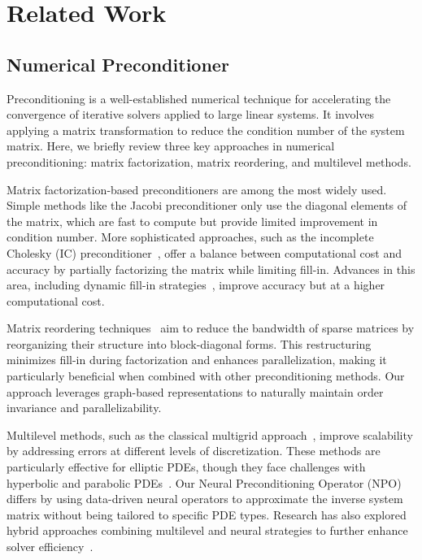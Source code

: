 \section{Related Work}
\label{appendix:relate}
\subsection{Numerical Preconditioner}

Preconditioning is a well-established numerical technique for accelerating the convergence of iterative solvers applied to large linear systems. It involves applying a matrix transformation to reduce the condition number of the system matrix. Here, we briefly review three key approaches in numerical preconditioning: matrix factorization, matrix reordering, and multilevel methods.

Matrix factorization-based preconditioners are among the most widely used. Simple methods like the Jacobi preconditioner only use the diagonal elements of the matrix, which are fast to compute but provide limited improvement in condition number. More sophisticated approaches, such as the incomplete Cholesky (IC) preconditioner~\cite{06:Numerical}, offer a balance between computational cost and accuracy by partially factorizing the matrix while limiting fill-in. Advances in this area, including dynamic fill-in strategies~\cite{12:Numerical}, improve accuracy but at a higher computational cost.

Matrix reordering techniques~\cite{Liu_book, davis1999modifying} aim to reduce the bandwidth of sparse matrices by reorganizing their structure into block-diagonal forms. This restructuring minimizes fill-in during factorization and enhances parallelization, making it particularly beneficial when combined with other preconditioning methods. Our approach leverages graph-based representations to naturally maintain order invariance and parallelizability.

Multilevel methods, such as the classical multigrid approach~\cite{00:tutorial}, improve scalability by addressing errors at different levels of discretization. These methods are particularly effective for elliptic PDEs, though they face challenges with hyperbolic and parabolic PDEs~\cite{TrotMult2001}. Our Neural Preconditioning Operator (NPO) differs by using data-driven neural operators to approximate the inverse system matrix without being tailored to specific PDE types. Research has also explored hybrid approaches combining multilevel and neural strategies to further enhance solver efficiency~\cite{chen_2021_icsiggraph}.

